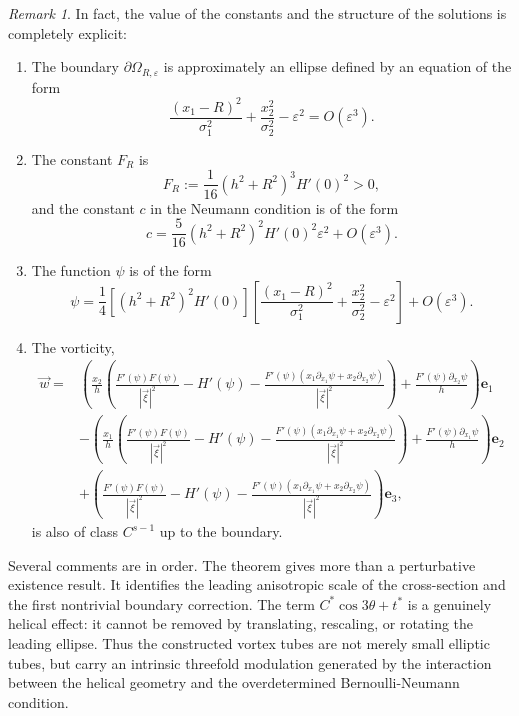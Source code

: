 \documentclass[12pt,reqno]{amsart}
\numberwithin{equation}{section}
\theoremstyle{definition}
\theoremstyle{remark}
\newtheorem{remark}[theorem]{Remark}
\begin{document}
	\begin{remark}\label{rem:constants}
	In fact, the value of the constants and the structure of the solutions is completely explicit:
	\begin{enumerate}%
		\item The boundary $\partial\varOmega_{R,\varepsilon}$ is  approximately an ellipse  defined by an equation of the form $$\frac{(x_1-R)^2}{\sigma_1^2 }+\frac{x_2^2}{\sigma_2^2}-\varepsilon^2=O(\varepsilon^3).$$
		\item The constant $F_R$ is
		\[
		F_R := \frac1{16} \left (h^2+R^2\right )^3H'(0)^2 > 0 ,
		\]
		and the constant $c$ in the Neumann condition is of the form
		\[
		c = \frac{5 }{16}\left (h^2+R^2\right )^2H'(0)^2\varepsilon^2  + O(\varepsilon^3) .
		\]
		\item The function $\psi$ is of the form
		\[
		\psi = \frac14 \left [ \left( h^2+R^2\right)^2 H'(0)  \right ]
		\left [ \frac{(x_1-R)^2}{\sigma_1^2 }+\frac{x_2^2}{\sigma_2^2}-\varepsilon^2 \right ] + O(\varepsilon^3) .
		\]
		\item  The vorticity,
		\begin{equation*} 
		\begin{split}
\vec{w}=&\left( \frac{x_2}{h}\left( \frac{F'(\psi)F(\psi)}{|\vec{\xi}|^2}-H'(\psi) -\frac{F'(\psi)\left( x_1\partial_{x_1}\psi+x_2\partial_{x_2}\psi\right) }{|\vec{\xi}|^2} \right)+\frac{F'(\psi)\partial_{x_2}\psi}{h}\right)  \textbf{e}_1\\
&-\left( \frac{x_1}{h}\left( \frac{F'(\psi)F(\psi)}{|\vec{\xi}|^2}-H'(\psi) -\frac{F'(\psi)\left( x_1\partial_{x_1}\psi+x_2\partial_{x_2}\psi\right) }{|\vec{\xi}|^2} \right)+\frac{F'(\psi)\partial_{x_1}\psi}{h}\right)  \textbf{e}_2\\
&+\left( \frac{F'(\psi)F(\psi)}{|\vec{\xi}|^2}-H'(\psi) -\frac{F'(\psi)\left( x_1\partial_{x_1}\psi+x_2\partial_{x_2}\psi\right) }{|\vec{\xi}|^2} \right) \textbf{e}_3,
		\end{split}
		\end{equation*}
		 is also of class $C^{s-1}$ up to the boundary.
	\end{enumerate}
\end{remark}
Several comments are in order. The theorem gives more than a perturbative existence result. It identifies the leading anisotropic scale of the cross-section and the first nontrivial boundary correction. The term $C^*\cos 3\theta+t^*$ is a genuinely helical effect: it cannot be removed by translating, rescaling, or rotating the leading ellipse. Thus the constructed vortex tubes are not merely small elliptic tubes, but carry an intrinsic threefold modulation generated by the interaction between the helical geometry and the overdetermined Bernoulli-Neumann condition.
\end{document}
